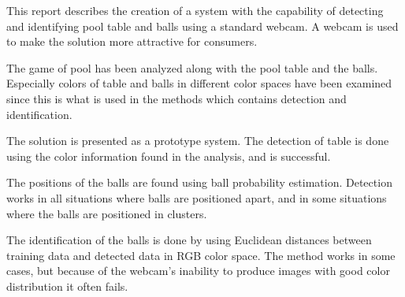 This report describes the creation of a system with the capability of detecting and identifying pool table and balls using a standard webcam. A webcam is used to make the solution more attractive for consumers.

The game of pool has been analyzed along with the pool table and the balls. Especially colors of table and balls in different color spaces have been examined since this is what is used in the methods which contains detection and identification.

The solution is presented as a prototype system. The detection of table is done using the color information found in the analysis, and is successful. 

The positions of the balls are found using ball probability estimation. Detection works in all situations where balls are positioned apart, and in some situations where the balls are positioned in clusters.

The identification of the balls is done by using Euclidean distances between training data and detected data in RGB color space. The method works in some cases, but because of the webcam's inability to produce images with good color distribution it often fails.